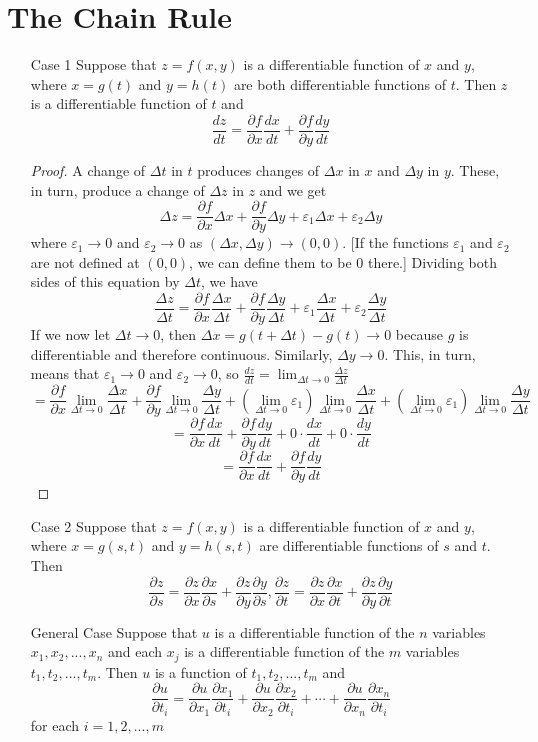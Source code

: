 \documentclass[10pt]{report}
\newcommand{\eps}{\varepsilon}
\begin{document}
\section{The Chain Rule}
\begin{itemize}
\item[Case 1] Suppose that $z=f(x,y)$ is a differentiable function of $x$ and $y$, where $x=g(t)$ and $y=h(t)$ are both differentiable functions of $t$. Then $z$ is a differentiable function of $t$ and
$$\frac{dz}{dt} = \frac{\partial f}{\partial x}\frac{dx}{dt} + \frac{\partial f}{\partial y}\frac{dy}{dt}$$
\begin{proof}
A change of $\Delta t$ in $t$ produces changes of $\Delta x$ in $x$ and $\Delta y$ in $y$. These, in turn, produce a change of $\Delta z$ in $z$ and we get
$$\Delta z = \frac{\partial f}{\partial x}\Delta x + \frac{\partial f}{\partial y}\Delta y + \eps_1\Delta x + \eps_2 \Delta y$$
where $\eps_1\to 0$ and $\eps_2\to 0$ as $(\Delta x, \Delta y)\to(0,0)$. [If the functions $\eps_1$ and $\eps_2$ are not defined at $(0,0)$, we can define them to be 0 there.] Dividing both sides of this equation by $\Delta t$, we have
$$\frac{\Delta z}{\Delta t} = \frac{\partial f}{\partial x}\frac{\Delta x}{\Delta t} + \frac{\partial f}{\partial y}\frac{\Delta y}{\Delta t} + \eps_1\frac{\Delta x}{\Delta t} + \eps_2\frac{\Delta y}{\Delta t}$$
If we now let $\Delta t\to 0$, then $\Delta x = g(t+\Delta t)-g(t)\to 0$ because $g$ is differentiable and therefore continuous. Similarly, $\Delta y\to 0$. This, in turn, means that $\eps_1\to 0$ and $\eps_2\to 0$, so $\frac{dz}{dt} = \lim_{\Delta t\to 0}\frac{\Delta z}{\Delta t}$
$$=\frac{\partial f}{\partial x}\lim_{\Delta t\to 0}\frac{\Delta x}{\Delta t}+\frac{\partial f}{\partial y}\lim_{\Delta t\to 0}\frac{\Delta y}{\Delta t} + \left( \lim_{\Delta t\to 0}\eps_1\right)\lim_{\Delta t\to 0}\frac{\Delta x}{\Delta t} + \left( \lim_{\Delta t\to 0}\eps_1\right)\lim_{\Delta t\to 0}\frac{\Delta y}{\Delta t}$$
$$=\frac{\partial f}{\partial x}\frac{dx}{dt} + \frac{\partial f}{\partial y}\frac{dy}{dt} + 0 \cdot\frac{dx}{dt} + 0\cdot\frac{dy}{dt}$$
$$=\frac{\partial f}{\partial x}\frac{dx}{dt} + \frac{\partial f}{\partial y}\frac{dy}{dt}$$
\end{proof}
\item[Case 2] Suppose that $z=f(x,y)$ is a differentiable function of $x$ and $y$, where $x=g(s,t)$ and $y=h(s,t)$ are differentiable functions of $s$ and $t$. Then
$$\frac{\partial z}{\partial s} = \frac{\partial z}{\partial x}\frac{\partial x}{\partial s} + \frac{\partial z}{\partial y}\frac{\partial y}{\partial s}, \frac{\partial z}{\partial t} = \frac{\partial z}{\partial x}\frac{\partial x}{\partial t} + \frac{\partial z}{\partial y}\frac{\partial y}{\partial t}$$
\item[General Case]Suppose that $u$ is a differentiable function of the $n$ variables $x_1, x_2, ..., x_n$ and each $x_j$ is a differentiable function of the $m$ variables $t_1, t_2, ..., t_m$. Then $u$ is a function of $t_1, t_2,...,t_m$ and
$$\frac{\partial u}{\partial t_i} = \frac{\partial u}{\partial x_1}\frac{\partial x_1}{\partial t_i} + \frac{\partial u}{\partial x_2}\frac{\partial x_2}{\partial t_i} + \cdots + \frac{\partial u}{\partial x_n}\frac{\partial x_n}{\partial t_i}$$
for each $i= 1,2,..., m$
\end{itemize}
\end{document}
